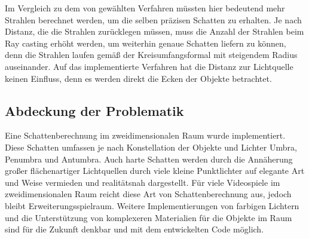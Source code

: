 Im Vergleich zu dem von gewählten Verfahren müssten hier bedeutend mehr Strahlen berechnet werden, um die
selben präzisen Schatten zu erhalten. Je nach Distanz, die die Strahlen zurücklegen müssen, muss die Anzahl
der Strahlen beim Ray casting erhöht werden, um weiterhin genaue Schatten liefern zu können, denn die Strahlen
laufen gemäß der Kreisumfangsformal mit steigendem Radius auseinander. Auf das implementierte Verfahren hat
die Distanz zur Lichtquelle keinen Einfluss, denn es werden direkt die Ecken der Objekte betrachtet.

\subsection{Abdeckung der Problematik}

Eine Schattenberechnung im zweidimensionalen Raum wurde implementiert. Diese Schatten umfassen je nach Konstellation der Objekte und Lichter Umbra, Penumbra
und Antumbra. Auch harte Schatten werden durch die Annäherung
großer flächenartiger Lichtquellen durch viele kleine Punktlichter auf elegante Art und Weise vermieden und realitätsnah
dargestellt. Für viele Videospiele im zweidimensionalen Raum reicht diese Art von Schattenberechnung aus,
jedoch bleibt Erweiterungsspielraum. Weitere Implementierungen von farbigen Lichtern und die Unterstützung
von komplexeren Materialien für die Objekte im Raum sind für die Zukunft denkbar und mit dem entwickelten Code möglich.
